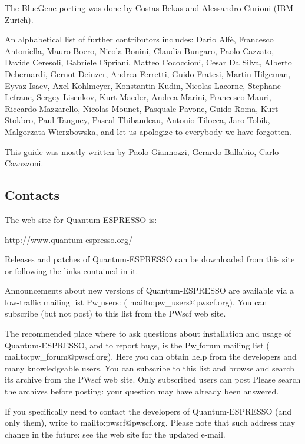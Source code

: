 \documentclass[12pt,a4paper]{article}
\begin{document}
The BlueGene porting was done by Costas Bekas and Alessandro Curioni
(IBM Zurich).

An alphabetical list of further contributors includes:
Dario Alf\`e,
Francesco Antoniella,
Mauro Boero,
Nicola Bonini,
Claudia Bungaro,
Paolo Cazzato,
Davide Ceresoli,
Gabriele Cipriani,
Matteo Cococcioni,
Cesar Da Silva, 
Alberto Debernardi,
Gernot Deinzer,
Andrea Ferretti, 
Guido Fratesi,
Martin Hilgeman,
Eyvaz Isaev, 
Axel Kohlmeyer,
Konstantin Kudin,
Nicolas Lacorne, 
Stephane Lefranc,
Sergey Lisenkov,
Kurt Maeder,
Andrea Marini,
Francesco Mauri,
Riccardo Mazzarello,
Nicolas Mounet,
Pasquale Pavone,
Guido Roma,
Kurt Stokbro,
Paul Tangney, 
Pascal Thibaudeau,
Antonio Tilocca,
Jaro Tobik,
Malgorzata Wierzbowska,
and let us apologize to everybody we have forgotten.

This guide was mostly written by Paolo Giannozzi, Gerardo Ballabio,
Carlo Cavazzoni.

\subsection{Contacts}

The web site for Quantum-ESPRESSO is:
\medskip

%
                  {http://www.quantum-espresso.org/}

\medskip
\noindent
Releases and patches of Quantum-ESPRESSO can be downloaded from this
site or following the links contained in it.

Announcements about new versions of Quantum-ESPRESSO are available
via a low-traffic mailing list Pw$\_$users:
(%
                   {mailto:pw\_users@pwscf.org}).
You can subscribe (but not post) to this list from the PWscf web site.

The recommended place where to ask questions about installation and
usage of Quantum-ESPRESSO, and to report bugs, is the Pw$\_$forum
mailing list
(%
                   {mailto:pw\_forum@pwscf.org}).
Here you can obtain help from the developers and many knowledgeable
users. You can subscribe to this list and browse and search its
archive from the PWscf web site.  Only subscribed users can post 
Please search the archives before posting: your 
question may have already been answered.

If you specifically need to contact the developers of Quantum-ESPRESSO
(and only them), write to
%
                  {mailto:pwscf@pwscf.org}. Please note that such
address may change in the future: see the web site for the updated e-mail.
\end{document}
